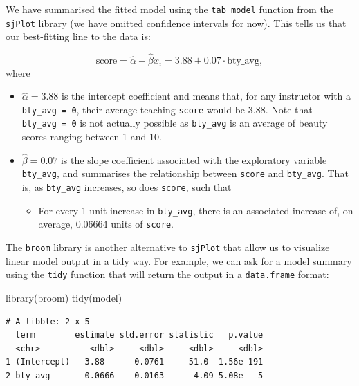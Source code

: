 \documentclass[
  letterpaper,
  DIV=11,
  numbers=noendperiod]{scrartcl}
\newenvironment{Shaded}{\begin{snugshade}}{\end{snugshade}}
\newcommand{\FunctionTok}[1]{\textcolor[rgb]{0.28,0.35,0.67}{#1}}
\newcommand{\NormalTok}[1]{\textcolor[rgb]{0.00,0.23,0.31}{#1}}
\providecommand{\tightlist}{%
  \setlength{\itemsep}{0pt}\setlength{\parskip}{0pt}}\usepackage{longtable,booktabs,array}
\begin{document}
We have summarised the fitted model using the \texttt{tab\_model}
function from the \texttt{sjPlot} library (we have omitted confidence
intervals for now). This tells us that our best-fitting line to the data
is:

\[\widehat{\text{score}} = \widehat{\alpha} + \widehat{\beta} x_i = 3.88 + 0.07 \cdot \mathrm{bty\_avg},\]
where

\begin{itemize}
\tightlist
\item
  \(\widehat{\alpha} = 3.88\) is the intercept coefficient and means
  that, for any instructor with a \texttt{bty\_avg\ =\ 0}, their average
  teaching \texttt{score} would be 3.88. Note that
  \texttt{bty\_avg\ =\ 0} is not actually possible as \texttt{bty\_avg}
  is an average of beauty scores ranging between 1 and 10.
\item
  \(\widehat{\beta} = 0.07\) is the slope coefficient associated with
  the exploratory variable \texttt{bty\_avg}, and summarises the
  relationship between \texttt{score} and \texttt{bty\_avg}. That is, as
  \texttt{bty\_avg} increases, so does \texttt{score}, such that

  \begin{itemize}
  \tightlist
  \item
    For every 1 unit increase in \texttt{bty\_avg}, there is an
    associated increase of, on average, 0.06664 units of \texttt{score}.
  \end{itemize}
\end{itemize}

\begin{tcolorbox}[enhanced jigsaw, opacityback=0, arc=.35mm, coltitle=black, toprule=.15mm, colback=white, opacitybacktitle=0.6, left=2mm, breakable, rightrule=.15mm, colbacktitle=quarto-callout-note-color!10!white, bottomrule=.15mm, bottomtitle=1mm, toptitle=1mm, titlerule=0mm, title=\textcolor{quarto-callout-note-color}{\faInfo}\hspace{0.5em}{Note}, leftrule=.75mm, colframe=quarto-callout-note-color-frame]

The \texttt{broom} library is another alternative to \texttt{sjPlot}
that allow us to visualize linear model output in a tidy way. For
example, we can ask for a model summary using the \texttt{tidy} function
that will return the output in a \texttt{data.frame} format:

\begin{Shaded}
\begin{Highlighting}[]
\FunctionTok{library}\NormalTok{(broom)}
\FunctionTok{tidy}\NormalTok{(model)}
\end{Highlighting}
\end{Shaded}

\begin{verbatim}
# A tibble: 2 x 5
  term        estimate std.error statistic   p.value
  <chr>          <dbl>     <dbl>     <dbl>     <dbl>
1 (Intercept)   3.88      0.0761     51.0  1.56e-191
2 bty_avg       0.0666    0.0163      4.09 5.08e-  5
\end{verbatim}

\end{tcolorbox}
\end{document}
